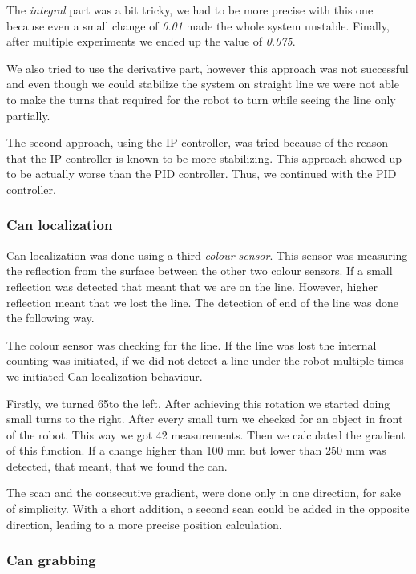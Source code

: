 \documentclass{article}
\begin{document}
The \textit{integral} part was a bit tricky, we had to be more precise with this one because even a small change of
\textit{0.01} made the whole system unstable. Finally, after multiple experiments we ended up the value of \textit{0.075}.

We also tried to use the derivative part, however this approach was not successful and even though we could stabilize
the system on straight line we were not able to make the turns that required for the robot to turn while seeing the line
only partially.

The second approach, using the IP controller, was tried because of the reason that the IP controller is known to be more
stabilizing. This approach showed up to be actually worse than the PID controller. Thus, we continued with the PID
controller.

\subsubsection{Can localization}
\label{subsubsec:can_localization}

Can localization was done using a third \textit{colour sensor}. This sensor was measuring the reflection from the surface
between the other two colour sensors. If a small reflection was detected that meant that we are on the line. However,
higher reflection meant that we lost the line. The detection of end of the line was done the following way.

The colour sensor was checking for the line. If the line was lost the internal counting was initiated, if we did not
detect a line under the robot multiple times we initiated Can localization behaviour.

Firstly, we turned 65\textdegree to the left. After achieving this rotation we started doing small turns to
the right. After every small turn we checked for an object in front of the robot. This way we got 42 measurements. Then
we calculated the gradient of this function. If a change higher than 100 mm but lower than 250 mm was detected, that
meant, that we found the can.

The scan and the consecutive gradient, were done only in one direction, for sake of simplicity. With a short
addition, a second scan could be added in the opposite direction, leading to a more precise position calculation.

\subsubsection*{Can grabbing}
\label{subsubsec:can-grabbing}
\end{document}
